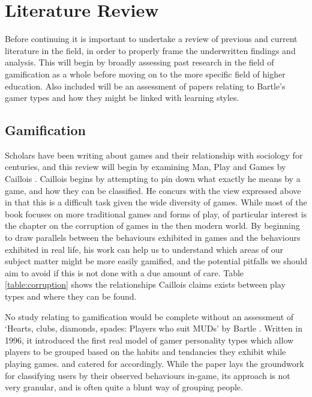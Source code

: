 \documentclass{article}
\begin{document}
\section{Literature Review}
Before continuing it is important to undertake a review of previous and current literature in the field, in order to properly frame the underwritten findings and analysis. This will begin by broadly assessing past research in the field of gamification as a whole before moving on to the more specific field of higher education. Also included will be an assessment of papers relating to Bartle's gamer types and how they might be linked with learning styles.

\subsection{Gamification}
Scholars have been writing about games and their relationship with sociology for centuries, and this review will begin by examining Man, Play and Games by Caillois \cite{caillois1961man}. Caillois begins by attempting to pin down what exactly he means by a game, and how they can be classified. He concurs with the view expressed above in that this is a difficult task given the wide diversity of games. While most of the book focuses on more traditional games and forms of play, of particular interest is the chapter on the corruption of games in the then modern world. By beginning to draw parallels between the behaviours exhibited in games and the behaviours exhibited in real life, his work can help us to understand which areas of our subject matter might be more easily gamified, and the potential pitfalls we should aim to avoid if this is not done with a due amount of care. Table \ref{table:corruption} shows the relationships Caillois claims exists between play types and where they can be found.

No study relating to gamification would be complete without an assessment of `Hearts, clubs, diamonds, spades: Players who suit MUDs' by Bartle \cite{bartle1996hearts}. Written in 1996, it introduced the first real model of gamer personality types which allow players to be grouped based on the habits and tendancies they exhibit while playing games. and catered for accordingly. While the paper lays the groundwork for classifying users by their observed behaviours in-game, its approach is not very granular, and is often quite a blunt way of grouping people.
\end{document}
